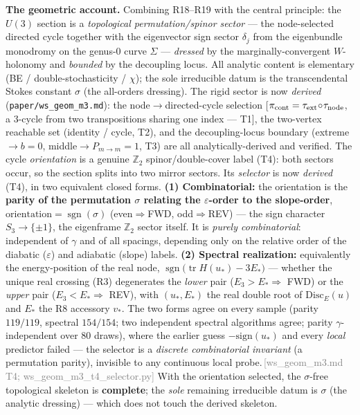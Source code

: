\documentclass[aps,prd,reprint,nofootinbib]{revtex4-2}
\newcommand{\pnote}[1]{\textcolor{gray}{\footnotesize\,[#1]}}
\newcommand{\eps}{\varepsilon}
\newcommand{\Pmid}{P_{m\to m}}   %
\begin{document}
\textbf{The geometric account.} Combining R18--R19 with the central principle: the $U(3)$ section is a
\emph{topological permutation/spinor sector} --- the node-selected directed cycle together with the
eigenvector sign sector $\delta_j$ from the eigenbundle monodromy on the genus-0 curve $\Sigma$ ---
\emph{dressed} by the marginally-convergent $W$-holonomy and \emph{bounded} by the decoupling locus. All
analytic content is elementary (BE / double-stochasticity / $\chi$); the sole irreducible datum is the
transcendental Stokes constant $\sigma$ (the all-orders dressing). The rigid sector is now
\emph{derived} (\texttt{paper/ws\_geom\_m3.md}): the node$\to$directed-cycle selection
[$\pi_{\rm cont}=\tau_{\rm ext}\!\circ\!\tau_{\rm node}$, a $3$-cycle from two transpositions sharing one
index --- T1], the two-vertex reachable set (identity / cycle, T2), and the decoupling-locus boundary
(extreme$\to b{=}0$, middle$\to\Pmid{=}1$, T3) are all analytically-derived and verified. The cycle
\emph{orientation} is a genuine $\mathbb Z_2$ spinor/double-cover label (T4): both sectors occur, so the
section splits into two mirror sectors. Its \emph{selector} is now \emph{derived} (T4), in two equivalent closed forms. \textbf{(1) Combinatorial:}
the orientation is the \textbf{parity of the permutation $\sigma$ relating the $\eps$-order to the
slope-order}, $\mathrm{orientation}=\operatorname{sgn}(\sigma)$ (even$\Rightarrow$FWD, odd$\Rightarrow$REV)
--- the sign character $S_3\to\{\pm1\}$, the eigenframe $\mathbb Z_2$ sector itself. It is \emph{purely
combinatorial}: independent of $\gamma$ and of all spacings, depending only on the relative order of the
diabatic ($\eps$) and adiabatic (slope) labels. \textbf{(2) Spectral realization:} equivalently the
energy-position of the real node, $\operatorname{sgn}\!\big(\operatorname{tr}H(u_*)-3E_*\big)$ --- whether
the unique real crossing (R3) degenerates the \emph{lower} pair ($E_3>E_*\Rightarrow$ FWD) or the
\emph{upper} pair ($E_3<E_*\Rightarrow$ REV), with $(u_*,E_*)$ the real double root of $\mathrm{Disc}_E(u)$
and $E_*$ the R8 accessory $v_*$. The two forms agree on every sample (parity $119/119$, spectral $154/154$;
two independent spectral algorithms agree; parity $\gamma$-independent over $80$ draws), where the earlier
guess $-\mathrm{sign}(u_*)$ and every \emph{local} predictor failed --- the selector is a \emph{discrete
combinatorial invariant} (a permutation parity), invisible to any continuous local
probe.\pnote{ws\_geom\_m3.md T4; ws\_geom\_m3\_t4\_selector.py} With the orientation selected, the
$\sigma$-free topological skeleton is \textbf{complete}; the \emph{sole} remaining irreducible datum is
$\sigma$ (the analytic dressing) --- which does not touch the derived skeleton.
\end{document}

